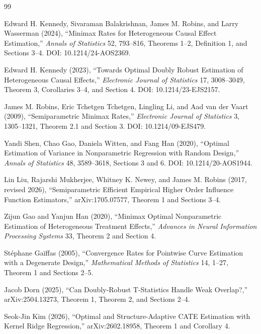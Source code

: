 \documentclass{article}
\begin{document}
\begin{thebibliography}{99}

   Edward H. Kennedy, Sivaraman Balakrishnan, James M. Robins, and Larry Wasserman (2024), ``Minimax Rates for Heterogeneous Causal Effect Estimation,'' \emph{Annals of Statistics} 52, 793--816, Theorems 1--2, Definition 1, and Sections 3--4. DOI: 10.1214/24-AOS2369.

   Edward H. Kennedy (2023), ``Towards Optimal Doubly Robust Estimation of Heterogeneous Causal Effects,'' \emph{Electronic Journal of Statistics} 17, 3008--3049, Theorem 3, Corollaries 3--4, and Section 4. DOI: 10.1214/23-EJS2157.

   James M. Robins, Eric Tchetgen Tchetgen, Lingling Li, and Aad van der Vaart (2009), ``Semiparametric Minimax Rates,'' \emph{Electronic Journal of Statistics} 3, 1305--1321, Theorem 2.1 and Section 3. DOI: 10.1214/09-EJS479.

   Yandi Shen, Chao Gao, Daniela Witten, and Fang Han (2020), ``Optimal Estimation of Variance in Nonparametric Regression with Random Design,'' \emph{Annals of Statistics} 48, 3589--3618, Sections 3 and 6. DOI: 10.1214/20-AOS1944.

   Lin Liu, Rajarshi Mukherjee, Whitney K. Newey, and James M. Robins (2017, revised 2026), ``Semiparametric Efficient Empirical Higher Order Influence Function Estimators,'' arXiv:1705.07577, Theorem 1 and Sections 3--4.

   Zijun Gao and Yanjun Han (2020), ``Minimax Optimal Nonparametric Estimation of Heterogeneous Treatment Effects,'' \emph{Advances in Neural Information Processing Systems} 33, Theorem 2 and Section 4.

   St\'ephane Ga\"iffas (2005), ``Convergence Rates for Pointwise Curve Estimation with a Degenerate Design,'' \emph{Mathematical Methods of Statistics} 14, 1--27, Theorem 1 and Sections 2--5.

   Jacob Dorn (2025), ``Can Doubly-Robust T-Statistics Handle Weak Overlap?,'' arXiv:2504.13273, Theorem 1, Theorem 2, and Sections 2--4.

   Seok-Jin Kim (2026), ``Optimal and Structure-Adaptive CATE Estimation with Kernel Ridge Regression,'' arXiv:2602.18958, Theorem 1 and Corollary 4.


\end{thebibliography}
\end{document}
